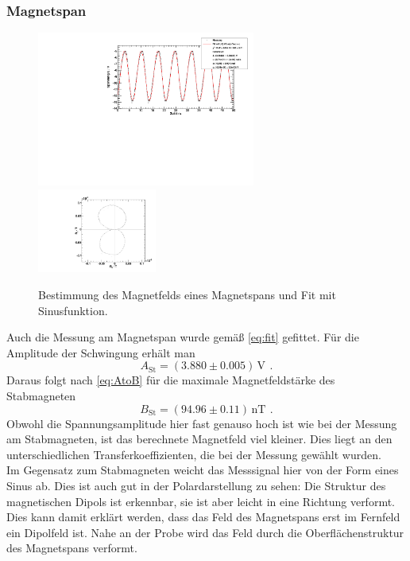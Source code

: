 \subsubsection{Magnetspan}
\begin{figure}[H]
\begin{center}
  \includegraphics[width=0.64\textwidth]{../img/fit_Magnetspan_45grad.pdf}
  \includegraphics[width=0.35\textwidth]{../img/polar_Magnetspan_45grad.pdf}
  \caption{Bestimmung des Magnetfelds eines Magnetspans und Fit mit Sinusfunktion.}
  \label{img:magnetspan}
\end{center}
\end{figure}
Auch die Messung am Magnetspan wurde gemäß \autoref{eq:fit} gefittet.
Für die Amplitude der Schwingung erhält man
\begin{equation}
\label{}
A_{\text{St}}=(3.880 \pm 0.005)\, \text{V} \ \, .
\end{equation}
Daraus folgt nach \autoref{eq:AtoB} für die maximale Magnetfeldstärke des Stabmagneten
\begin{equation}
\label{}
B_{\text{St}} = (94.96 \pm 0.11)\,\text{nT} \ \, .
\end{equation}
Obwohl die Spannungsamplitude hier fast genauso hoch ist wie bei der Messung am Stabmagneten,
ist das berechnete Magnetfeld viel kleiner. Dies liegt an den unterschiedlichen Transferkoeffizienten,
die bei der Messung gewählt wurden.\\ 
Im Gegensatz zum Stabmagneten weicht das Messsignal hier von der Form eines Sinus ab.
Dies ist auch gut in der Polardarstellung zu sehen:
Die Struktur des magnetischen Dipols ist erkennbar, sie ist aber leicht in eine Richtung verformt.
Dies kann damit erklärt werden, dass das Feld des Magnetspans erst im Fernfeld ein Dipolfeld ist.
Nahe an der Probe wird das Feld durch die Oberflächenstruktur des Magnetspans verformt.


